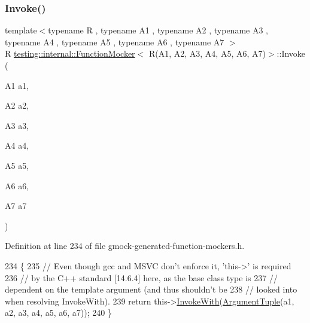 \subsubsection{\texorpdfstring{Invoke()}{Invoke()}}
{\footnotesize\ttfamily template$<$typename R , typename A1 , typename A2 , typename A3 , typename A4 , typename A5 , typename A6 , typename A7 $>$ \\
R \hyperlink{classtesting_1_1internal_1_1FunctionMocker}{testing\+::internal\+::\+Function\+Mocker}$<$ R(A1, A2, A3, A4, A5, A6, A7)$>$\+::Invoke (\begin{DoxyParamCaption}\item[{A1}]{a1,  }\item[{A2}]{a2,  }\item[{A3}]{a3,  }\item[{A4}]{a4,  }\item[{A5}]{a5,  }\item[{A6}]{a6,  }\item[{A7}]{a7 }\end{DoxyParamCaption})\hspace{0.3cm}{\ttfamily [inline]}}



Definition at line 234 of file gmock-\/generated-\/function-\/mockers.\+h.


\begin{DoxyCode}
234                                                             \{
235     \textcolor{comment}{// Even though gcc and MSVC don't enforce it, 'this->' is required}
236     \textcolor{comment}{// by the C++ standard [14.6.4] here, as the base class type is}
237     \textcolor{comment}{// dependent on the template argument (and thus shouldn't be}
238     \textcolor{comment}{// looked into when resolving InvokeWith).}
239     \textcolor{keywordflow}{return} this->\hyperlink{classtesting_1_1internal_1_1FunctionMockerBase_a869ec713f000b4e7829c660efc25e8cd}{InvokeWith}(\hyperlink{classtesting_1_1internal_1_1FunctionMocker_3_01R_07A1_00_01A2_00_01A3_00_01A4_00_01A5_00_01A6_00_01A7_08_4_a313911b9c80b57c8c25f0ad5ef2d0bdc}{ArgumentTuple}(a1, a2, a3, a4, a5, a6, a7));
240   \}
\end{DoxyCode}
\mbox{\label{classtesting_1_1internal_1_1FunctionMocker_3_01R_07A1_00_01A2_00_01A3_00_01A4_00_01A5_00_01A6_00_01A7_08_4_abaa600e7ae355a1579d1c02a4ea726fb}} 
